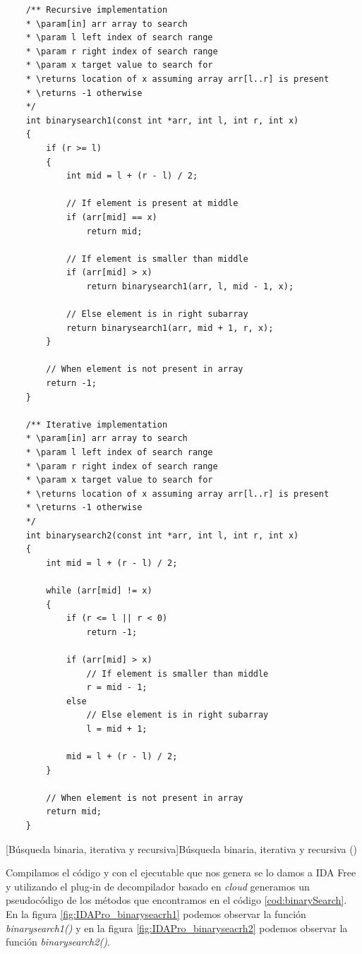 \begin{code}
    \begin{verbatim}
    /** Recursive implementation
    * \param[in] arr array to search
    * \param l left index of search range
    * \param r right index of search range
    * \param x target value to search for
    * \returns location of x assuming array arr[l..r] is present
    * \returns -1 otherwise
    */
    int binarysearch1(const int *arr, int l, int r, int x)
    {
        if (r >= l)
        {
            int mid = l + (r - l) / 2;

            // If element is present at middle
            if (arr[mid] == x)
                return mid;

            // If element is smaller than middle
            if (arr[mid] > x)
                return binarysearch1(arr, l, mid - 1, x);

            // Else element is in right subarray
            return binarysearch1(arr, mid + 1, r, x);
        }

        // When element is not present in array
        return -1;
    }

    /** Iterative implementation
    * \param[in] arr array to search
    * \param l left index of search range
    * \param r right index of search range
    * \param x target value to search for
    * \returns location of x assuming array arr[l..r] is present
    * \returns -1 otherwise
    */
    int binarysearch2(const int *arr, int l, int r, int x)
    {
        int mid = l + (r - l) / 2;

        while (arr[mid] != x)
        {
            if (r <= l || r < 0)
                return -1;

            if (arr[mid] > x)
                // If element is smaller than middle
                r = mid - 1;
            else
                // Else element is in right subarray
                l = mid + 1;

            mid = l + (r - l) / 2;
        }

        // When element is not present in array
        return mid;
    }
    \end{verbatim}
    [Búsqueda binaria, iterativa y recursiva]{Búsqueda binaria, iterativa y recursiva (\cite{BinarySearchGitHub})}
    \label{cod:binarySearch}
\end{code}

Compilamos el código y con el ejecutable que nos genera se lo damos a IDA Free y utilizando el plug-in de decompilador basado en \textit{cloud} generamos un pseudocódigo de los métodos
que encontramos en el código \ref{cod:binarySearch}. En la figura \ref{fig:IDAPro_binaryseacrh1} podemos observar la función \textit{binarysearch1()} y en la figura \ref{fig:IDAPro_binaryseacrh2}
podemos observar la función \textit{binarysearch2()}.

